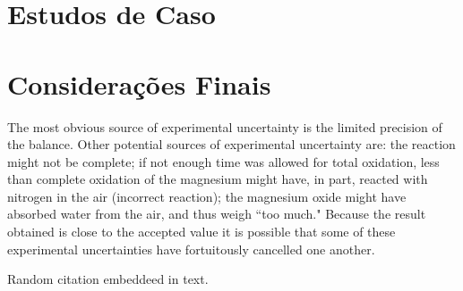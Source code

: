 \documentclass[a4paper,12pt]{article}
\begin{document}
            
        
        \section{Estudos de Caso}
        
        
        
        
        
        \section{Considerações Finais}
        
        
        The most obvious source of experimental uncertainty is the limited precision of the balance. Other potential sources of experimental uncertainty are: the reaction might not be complete; if not enough time was allowed for total oxidation, less than complete oxidation of the magnesium might have, in part, reacted with nitrogen in the air (incorrect reaction); the magnesium oxide might have absorbed water from the air, and thus weigh ``too much." Because the result obtained is close to the accepted value it is possible that some of these experimental uncertainties have fortuitously cancelled one another.

        Random citation \cite{WEBSITE:2} embeddeed in text.

        
        
        
        


    
\end{document}
